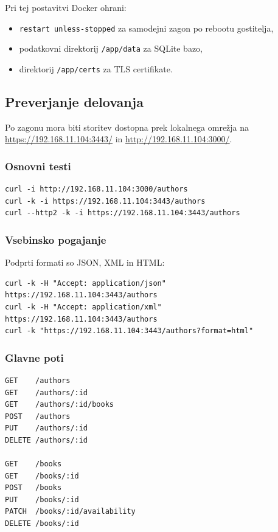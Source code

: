 \documentclass[a4paper,11pt]{article}
\begin{document}
Pri tej postavitvi Docker ohrani:
\begin{itemize}
  \item \texttt{restart unless-stopped} za samodejni zagon po rebootu gostitelja,
  \item podatkovni direktorij \texttt{/app/data} za SQLite bazo,
  \item direktorij \texttt{/app/certs} za TLS certifikate.
\end{itemize}

\subsection{Preverjanje delovanja}
Po zagonu mora biti storitev dostopna prek lokalnega omrežja na \url{https://192.168.11.104:3443/} in \url{http://192.168.11.104:3000/}.

\subsubsection{Osnovni testi}
\begin{lstlisting}
curl -i http://192.168.11.104:3000/authors
curl -k -i https://192.168.11.104:3443/authors
curl --http2 -k -i https://192.168.11.104:3443/authors
\end{lstlisting}

\subsubsection{Vsebinsko pogajanje}
Podprti formati so JSON, XML in HTML:

\begin{lstlisting}
curl -k -H "Accept: application/json" https://192.168.11.104:3443/authors
curl -k -H "Accept: application/xml" https://192.168.11.104:3443/authors
curl -k "https://192.168.11.104:3443/authors?format=html"
\end{lstlisting}

\subsubsection{Glavne poti}
\begin{lstlisting}
GET    /authors
GET    /authors/:id
GET    /authors/:id/books
POST   /authors
PUT    /authors/:id
DELETE /authors/:id

GET    /books
GET    /books/:id
POST   /books
PUT    /books/:id
PATCH  /books/:id/availability
DELETE /books/:id
\end{lstlisting}
\end{document}
